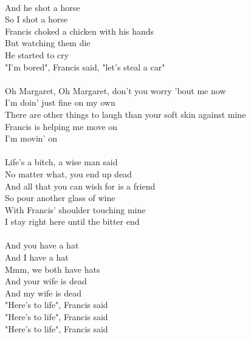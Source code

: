 {\\
And he shot a horse\\
So I shot a horse\\
Francis choked a chicken with his hands\\
But watching them die\\
He started to cry\\
"I'm bored", Francis said, "let's steal a car"\\
\\
Oh Margaret, Oh Margaret, don't you worry 'bout me now\\
I'm doin' just fine on my own\\
There are other things to laugh than your soft skin against mine\\
Francis is helping me move on\\
I'm movin' on\\
\\
Life's a bitch, a wise man said\\
No matter what, you end up dead\\
And all that you can wish for is a friend\\
So pour another glass of wine\\
With Francis' shoulder touching mine\\
I stay right here until the bitter end\\
\\
And you have a hat\\
And I have a hat\\
Mmm, we both have hats\\
And your wife is dead\\
And my wife is dead\\
"Here's to life", Francis said\\
"Here's to life", Francis said\\
"Here's to life", Francis said
}




